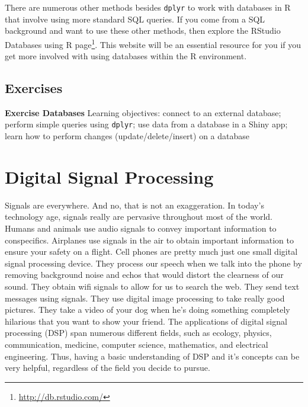 \documentclass[
]{krantz}
\renewcommand{\href}[2]{#2\footnote{\url{#1}}}
\begin{document}
There are numerous other methods besides \texttt{dplyr} to work with databases in R that involve using more standard SQL queries. If you come from a SQL background and want to use these other methods, then explore the \href{http://db.rstudio.com/}{RStudio Databases using R page}. This website will be an essential resource for you if you get more involved with using databases within the R environment.

\hypertarget{exercises-10}{%
\section{Exercises}\label{exercises-10}}

\textbf{Exercise Databases} Learning objectives: connect to an external database; perform simple queries using \texttt{dplyr}; use data from a database in a Shiny app; learn how to perform changes (update/delete/insert) on a database

\hypertarget{digital-signal-processing}{%
\chapter{Digital Signal Processing}\label{digital-signal-processing}}

Signals are everywhere. And no, that is not an exaggeration. In today's technology age, signals really are pervasive throughout most of the world. Humans and animals use audio signals to convey important information to conspecifics. Airplanes use signals in the air to obtain important information to ensure your safety on a flight. Cell phones are pretty much just one small digital signal processing device. They process our speech when we talk into the phone by removing background noise and echos that would distort the clearness of our sound. They obtain wifi signals to allow for us to search the web. They send text messages using signals. They use digital image processing to take really good pictures. They take a video of your dog when he's doing something completely hilarious that you want to show your friend. The applications of digital signal processing (DSP) span numerous different fields, such as ecology, physics, communication, medicine, computer science, mathematics, and electrical engineering. Thus, having a basic understanding of DSP and it's concepts can be very helpful, regardless of the field you decide to pursue.
\end{document}
